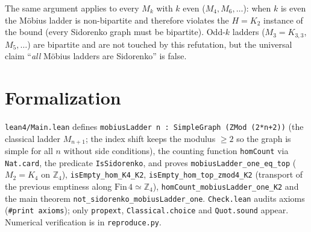 \documentclass[11pt]{article}
\begin{document}
The same argument applies to every $M_k$ with $k$ even ($M_4, M_6,\dots$):
when $k$ is even the M\"obius ladder is non-bipartite and therefore
violates the $H=K_2$ instance of the bound (every Sidorenko graph must be
bipartite).  Odd-$k$ ladders ($M_3=K_{3,3}$, $M_5,\dots$) are bipartite
and are not touched by this refutation, but the universal claim
``\emph{all} M\"obius ladders are Sidorenko'' is false.

\section{Formalization}
\texttt{lean4/Main.lean} defines
\texttt{mobiusLadder n : SimpleGraph (ZMod (2*n+2))} (the classical ladder
$M_{n+1}$; the index shift keeps the modulus $\ge2$ so the graph is simple
for all $n$ without side conditions), the counting function
\texttt{homCount} via \texttt{Nat.card}, the predicate
\texttt{IsSidorenko}, and proves \texttt{mobiusLadder\_one\_eq\_top}
($M_2 = K_4$ on $\mathbb Z_4$), \texttt{isEmpty\_hom\_K4\_K2},
\texttt{isEmpty\_hom\_top\_zmod4\_K2} (transport of the previous
emptiness along $\mathrm{Fin}\,4\simeq\mathbb Z_4$),
\texttt{homCount\_mobiusLadder\_one\_K2} and the main theorem
\texttt{not\_sidorenko\_mobiusLadder\_one}.
\texttt{Check.lean} audits axioms (\texttt{\#print axioms}); only
\texttt{propext}, \texttt{Classical.choice} and \texttt{Quot.sound} appear.
Numerical verification is in \texttt{reproduce.py}.
\end{document}
